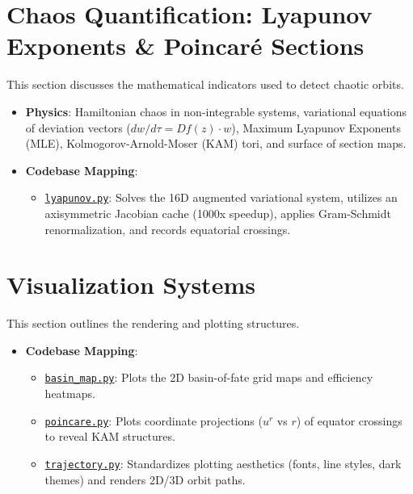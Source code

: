 \documentclass[11pt,a4paper]{article}
\begin{document}
\section{Chaos Quantification: Lyapunov Exponents \& Poincaré Sections}
This section discusses the mathematical indicators used to detect chaotic orbits.
\begin{itemize}
    \item \textbf{Physics}: Hamiltonian chaos in non-integrable systems, variational equations of deviation vectors ($dw/d\tau = Df(z)\cdot w$), Maximum Lyapunov Exponents (MLE), Kolmogorov-Arnold-Moser (KAM) tori, and surface of section maps.
    \item \textbf{Codebase Mapping}:
    \begin{itemize}
        \item \href{file:///Users/vihaa/Desktop/grtp-kerr/grtp/analysis/lyapunov.py}{\texttt{lyapunov.py}}: Solves the 16D augmented variational system, utilizes an axisymmetric Jacobian cache (1000x speedup), applies Gram-Schmidt renormalization, and records equatorial crossings.
    \end{itemize}
\end{itemize}

\section{Visualization Systems}
This section outlines the rendering and plotting structures.
\begin{itemize}
    \item \textbf{Codebase Mapping}:
    \begin{itemize}
        \item \href{file:///Users/vihaa/Desktop/grtp-kerr/grtp/viz/basin_map.py}{\texttt{basin\_map.py}}: Plots the 2D basin-of-fate grid maps and efficiency heatmaps.
        \item \href{file:///Users/vihaa/Desktop/grtp-kerr/grtp/viz/poincare.py}{\texttt{poincare.py}}: Plots coordinate projections ($u^r$ vs $r$) of equator crossings to reveal KAM structures.
        \item \href{file:///Users/vihaa/Desktop/grtp-kerr/grtp/viz/trajectory.py}{\texttt{trajectory.py}}: Standardizes plotting aesthetics (fonts, line styles, dark themes) and renders 2D/3D orbit paths.
    \end{itemize}
\end{itemize}
\end{document}
